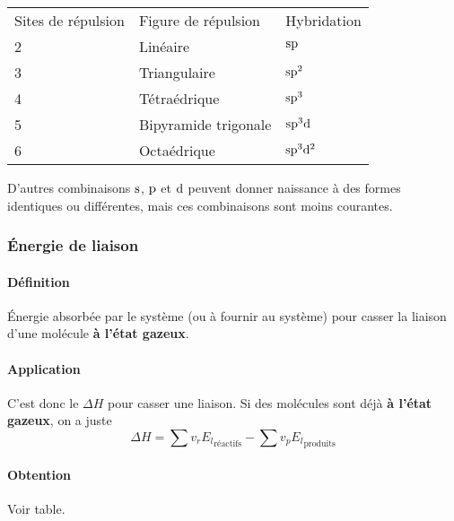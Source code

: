 \begin{center}
  \begin{tabular}{lll}
    Sites de répulsion & Figure de répulsion & Hybridation\\
    2 & Linéaire & $\mathrm{s}\mathrm{p}$\\
    3 & Triangulaire & $\mathrm{s}\mathrm{p}^2$\\
    4 & Tétraédrique & $\mathrm{s}\mathrm{p}^3$\\
    5 & Bipyramide trigonale & $\mathrm{s}\mathrm{p}^3\mathrm{d}$\\
    6 & Octaédrique & $\mathrm{s}\mathrm{p}^3\mathrm{d}^2$\\
  \end{tabular}
\end{center}

D'autres combinaisons $\mathrm{s}$,
$\mathrm{p}$ et $\mathrm{d}$ peuvent donner naissance à des formes identiques ou différentes,
mais ces combinaisons sont moins courantes.

\subsubsection{\'Energie de liaison}
\label{sec:E_l}

\paragraph{Définition}
\'Energie absorbée par le système (ou à fournir au système) pour casser la liaison d'une molécule \textbf{à l'état gazeux}.

\paragraph{Application}
C'est donc le $\Delta H$ pour casser une liaison.
Si des molécules sont déjà \textbf{à l'état gazeux},
on a juste
\[ \Delta H = \sum v_r{E_l}_\mathrm{réactifs} - \sum v_p{E_l}_\mathrm{produits} \]

\paragraph{Obtention}
Voir table.

